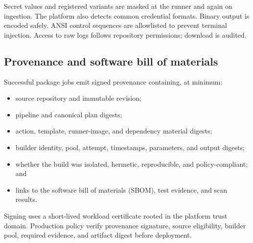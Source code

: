 Secret values and registered variants are masked at the runner and again on ingestion.
The platform also detects common credential formats. Binary output is encoded safely.
ANSI control sequences are allowlisted to prevent terminal injection. Access to raw
logs follows repository permissions; download is audited.

\subsection{Provenance and software bill of materials}

Successful package jobs emit signed provenance containing, at minimum:

\begin{itemize}
  \item source repository and immutable revision;
  \item pipeline and canonical plan digests;
  \item action, template, runner-image, and dependency material digests;
  \item builder identity, pool, attempt, timestamps, parameters, and output digests;
  \item whether the build was isolated, hermetic, reproducible, and policy-compliant; and
  \item links to the software bill of materials (SBOM), test evidence, and scan results.
\end{itemize}

Signing uses a short-lived workload certificate rooted in the platform trust domain.
Production policy \must verify provenance signature, source eligibility, builder pool,
required evidence, and artifact digest before deployment.

